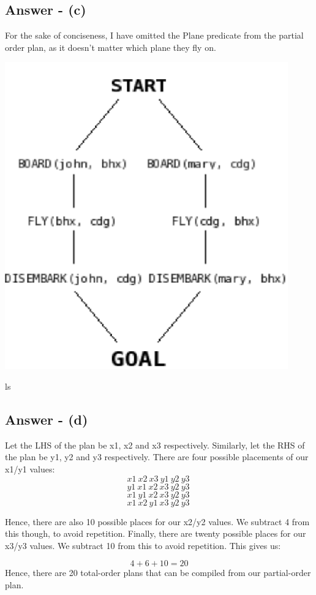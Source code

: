 \documentclass{article}
\begin{document}
\subsection{Answer - (c)}
For the sake of conciseness, I have omitted the Plane predicate from the partial order plan, as it doesn't matter which plane they fly on.
\begin{center}
\includegraphics{IntroToAIE2PartialPlan.png}
\end{center}ls

\subsection{Answer - (d)}
Let the LHS of the plan be x1, x2 and x3 respectively. Similarly, let the RHS of the plan be y1, y2 and y3 respectively. There are four possible placements of our x1/y1 values: \\

$$ x1\ x2\ x3\ y1\ y2\ y3\ $$
$$ y1\ x1\ x2\ x3\ y2\ y3\ $$
$$ x1\ y1\ x2\ x3\ y2\ y3\ $$
$$ x1\ x2\ y1\ x3\ y2\ y3\ $$

Hence, there are also 10 possible places for our x2/y2 values. We subtract 4 from this though, to avoid repetition. Finally, there are twenty possible places for our x3/y3 values. We subtract 10 from this to avoid repetition. This gives us:

$$4 + 6 + 10 = 20$$
Hence, there are 20 total-order plans that can be compiled from our partial-order plan.
\end{document}
